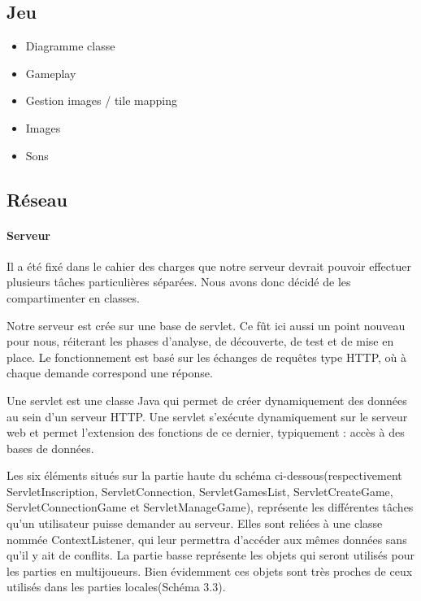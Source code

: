 \subsection{Jeu}
	\begin{itemize}
		\item{Diagramme classe}
		\item{Gameplay}
		\item{Gestion images / tile mapping}
		\item{Images}
		\item{Sons}
	\end{itemize}
			

\subsection{Réseau}
		
	\paragraph{Serveur\\}
			
		Il a été fixé dans le cahier des charges que notre serveur devrait pouvoir
		effectuer plusieurs tâches particulières séparées. Nous avons donc décidé de
		les compartimenter en classes.
		
		Notre serveur est crée sur une base de servlet. Ce fût ici
		aussi un point nouveau pour nous, réiterant les phases d'analyse, de
		découverte, de test et de mise en place. Le fonctionnement est basé sur les
		échanges de requêtes type HTTP, où à chaque demande correspond une réponse. 
		
		Une servlet est une classe Java qui permet de créer dynamiquement des données
		au sein d'un serveur HTTP. Une servlet s'exécute dynamiquement sur le serveur
		web et permet l'extension des fonctions de ce dernier, typiquement : accès à
		des bases de données.
			
		Les six éléments situés sur la partie haute du schéma
		ci-dessous(respectivement ServletInscription, ServletConnection,
		ServletGamesList, ServletCreateGame, ServletConnectionGame et
		ServletManageGame), représente les différentes tâches qu'un utilisateur
		puisse demander au serveur. Elles sont reliées à une classe nommée
		ContextListener, qui leur permettra d'accéder aux mêmes données sans qu'il y
		ait de conflits. La partie basse représente les objets qui seront utilisés pour les parties en multijoueurs. 
		Bien évidemment ces objets sont très proches de ceux utilisés dans les parties
		locales(Schéma 3.3).
		
